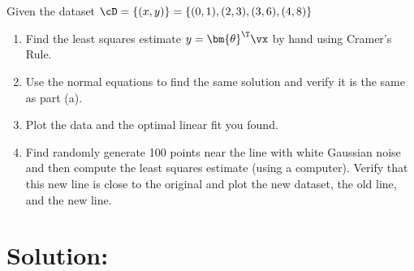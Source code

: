 \documentclass[189]{pset}
\begin{document}
  \section{}
    Given the dataset $\cD = \{(x,y)\} = \{(0,1), (2,3), (3,6), (4,8)\}$
    \begin{enumerate}
      \item Find the least squares estimate $y = {\bm{\theta}}^\T\vx$ by
        hand using Cramer's Rule.
      \item Use the normal equations to find the same solution and
        verify it is the same as part (a).
      \item Plot the data and the optimal linear fit you found.
      \item Find randomly generate 100 points near the line with white
        Gaussian noise and then compute the least squares estimate
        (using a computer). Verify that this new line is close to the
        original and plot the new dataset, the old line, and the new
        line.
    \end{enumerate}

  \hrulefill

  \section*{Solution:}
\end{document}
